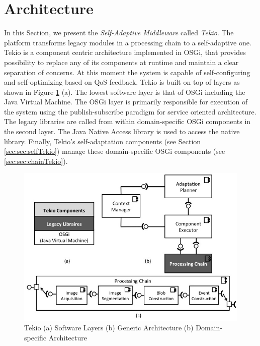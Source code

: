 \section{Architecture}
\label{sec:architecture}

In this Section, we present the \emph{Self-Adaptive Middleware} called \emph{Tekio}.  The platform transforms legacy modules in a processing chain to a self-adaptive one. Tekio is a component centric architecture implemented in OSGi, that provides possibility to replace any of its components at runtime and maintain a clear separation of concerns. At this moment the system is capable of self-configuring and self-optimizing based on QoS feedback. Tekio is built on top of layers as shown in Figure \ref{fig:tekioArch} (a). The lowest software layer is that of OSGi including the Java Virtual Machine. The OSGi layer is primarily responsible for execution of the system using the publish-subscribe paradigm for service oriented architecture. The legacy libraries are called from within domain-specific OSGi components in the second layer. The Java Native Access library is used to access the native library. Finally, Tekio's self-adaptation components (see Section \ref{sec:sec:selfTekio}) manage these domain-specific OSGi components (see \ref{sec:sec:chainTekio}). 



\begin{figure}
	\includegraphics[scale=0.3]{images/architecture.jpg}
	 \caption{Tekio (a) Software Layers (b) Generic Architecture (b) Domain-specific Architecture}
	 \label{fig:tekioArch} 
\end{figure}

